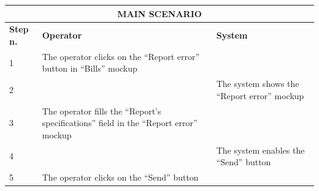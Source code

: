 {{{			\begin{table}[h]
			\begin{tabular}{|p{2cm}|p{6cm}|p{6cm}|}
			\hline
				\multicolumn{3}{|c|}{MAIN SCENARIO} \\
			\hline
				\vspace{1mm} \bfseries{Step n.} \vspace{1mm} &
				\vspace{1mm} \bfseries{Operator} \vspace{1mm} & 
				\vspace{1mm} \bfseries{System} \vspace{1mm}\\
			\hline
				\vspace{1mm} 1 \vspace{1mm} &
				\vspace{1mm} The operator clicks on the “Report error” button in “Bills” mockup \vspace{1mm} & 
				\vspace{1mm} \vspace{1mm} \\
			\hline
				\vspace{1mm} 2 \vspace{1mm} &
				\vspace{1mm} \vspace{1mm} & 
				\vspace{1mm} The system shows the “Report error” mockup \vspace{1mm} \\
			\hline
				\vspace{1mm} 3 \vspace{1mm} &
				\vspace{1mm} The operator fills the “Report’s specifications” field in the “Report error”  mockup \vspace{1mm} & 
				\vspace{1mm} \vspace{1mm} \\
			\hline
				\vspace{1mm} 4 \vspace{1mm} &
				\vspace{1mm} \vspace{1mm} & 
				\vspace{1mm} The system enables the “Send” button \vspace{1mm} \\
			\hline
				\vspace{1mm} 5 \vspace{1mm} &
				\vspace{1mm} The operator clicks on the “Send” button \vspace{1mm} & 

\end{tabular}
\end{table}}}}
